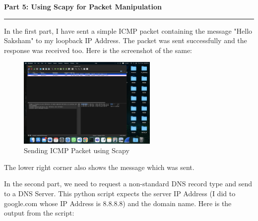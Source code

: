 \documentclass[a4paper,12pt]{article}
\newenvironment{solution}[2][]{%
    \begin{mdframed}[linecolor=blue!70!black, linewidth=2pt, roundcorner=10pt, backgroundcolor=yellow!10!white, skipabove=12pt, skipbelow=12pt]%
        \textbf{\large #2}
        \par\noindent\rule{\textwidth}{0.4pt}
}{
    \end{mdframed}
}
\begin{document}
\begin{solution}{Part 5: Using Scapy for Packet Manipulation}
    In the first part, I have sent a simple ICMP packet containing the message "Hello Saksham" to my loopback IP Address. The packet was sent successfully and the response was received too. Here is the screenshot of the same:

    \begin{figure}[H]
        \centering
        \includegraphics[width=0.6\textwidth]{p51.png}
        \caption{Sending ICMP Packet using Scapy}
    \end{figure}

    The lower right corner also shows the message which was sent.

    In the second part, we need to request a non-standard DNS record type and send to a DNS Server. This python script expects the server IP Address (I did to google.com whose IP Address is 8.8.8.8) and the domain name. Here is the output from the script:
    

\end{solution}
\end{document}
